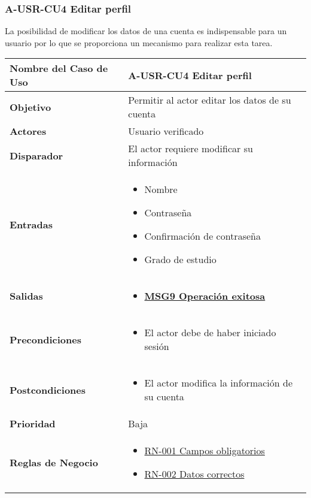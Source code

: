 \subsubsection{A-USR-CU4 Editar perfil}
La posibilidad de modificar los datos de una cuenta es indispensable para un usuario por lo que se proporciona un mecanismo para realizar esta tarea.
\begin{longtable}{|J{5cm}|J{10.3cm}|}
	\hline
	\textbf{Nombre del Caso de Uso} &
		A-USR-CU4 Editar perfil \\ \hline
	\textbf{Objetivo} &
		Permitir al actor editar los datos de su cuenta \\ \hline
	\textbf{Actores} &
		Usuario verificado \\ \hline 
	\textbf{Disparador} & 
		El actor requiere modificar su información \\ \hline 
	\textbf{Entradas} & 
		\begin{itemize}
		    \item Nombre
		    \item Contraseña
		    \item Confirmación de contraseña
		    \item Grado de estudio
		\end{itemize} \\ \hline 
	\textbf{Salidas} & 
		\begin{itemize}
		    \item \hyperref[MSG9]{\bf MSG9 Operación exitosa}
		\end{itemize} \\ \hline
	\textbf{Precondiciones} &
		\begin{itemize}
				\item El actor debe de haber iniciado sesión
		\end{itemize} \\ \hline
	\textbf{Postcondiciones} &
		\begin{itemize}
			\item El actor modifica la información de su cuenta
		\end{itemize}\\ \hline
	\textbf{Prioridad} & 
		Baja \\ \hline
	\textbf{Reglas de Negocio} &
	    \begin{itemize}
		    \item \hyperref[RN001]{RN-001 Campos obligatorios}
		    \item \hyperref[RN002]{RN-002 Datos correctos}
		\end{itemize} \\ \hline

\end{longtable}
